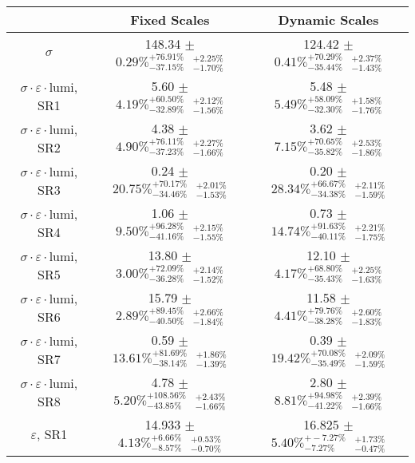 \documentclass{article}
\begin{document}
\renewcommand{\arraystretch}{1.5}
\begin{table}
\begin{tabular}{|c|c|c|}
\hline
 & Fixed Scales & Dynamic Scales\\
\hline
$\sigma$ & 148.34 $\pm$ $0.29\%^{+76.91\%}_{-37.15\%} \textrm{ }^{+2.25\%}_{-1.70\%}$ & 124.42 $\pm$ $0.41\%^{+70.29\%}_{-35.44\%} \textrm{ }^{+2.37\%}_{-1.43\%}$ \\
\hline
$\sigma \cdot \varepsilon \cdot \textrm{lumi}$, SR1 & 5.60 $\pm$ $4.19\%^{+60.50\%}_{-32.89\%} \textrm{ }^{+2.12\%}_{-1.56\%}$ & 5.48 $\pm$ $5.49\%^{+58.09\%}_{-32.30\%} \textrm{ }^{+1.58\%}_{-1.76\%}$ \\
\hline
$\sigma \cdot \varepsilon \cdot \textrm{lumi}$, SR2 & 4.38 $\pm$ $4.90\%^{+76.11\%}_{-37.23\%} \textrm{ }^{+2.27\%}_{-1.66\%}$ & 3.62 $\pm$ $7.15\%^{+70.65\%}_{-35.82\%} \textrm{ }^{+2.53\%}_{-1.86\%}$ \\
\hline
$\sigma \cdot \varepsilon \cdot \textrm{lumi}$, SR3 & 0.24 $\pm$ $20.75\%^{+70.17\%}_{-34.46\%} \textrm{ }^{+2.01\%}_{-1.53\%}$ & 0.20 $\pm$ $28.34\%^{+66.67\%}_{-34.38\%} \textrm{ }^{+2.11\%}_{-1.59\%}$ \\
\hline
$\sigma \cdot \varepsilon \cdot \textrm{lumi}$, SR4 & 1.06 $\pm$ $9.50\%^{+96.28\%}_{-41.16\%} \textrm{ }^{+2.15\%}_{-1.55\%}$ & 0.73 $\pm$ $14.74\%^{+91.63\%}_{-40.11\%} \textrm{ }^{+2.21\%}_{-1.75\%}$ \\
\hline
$\sigma \cdot \varepsilon \cdot \textrm{lumi}$, SR5 & 13.80 $\pm$ $3.00\%^{+72.09\%}_{-36.28\%} \textrm{ }^{+2.14\%}_{-1.52\%}$ & 12.10 $\pm$ $4.17\%^{+68.80\%}_{-35.43\%} \textrm{ }^{+2.25\%}_{-1.63\%}$ \\
\hline
$\sigma \cdot \varepsilon \cdot \textrm{lumi}$, SR6 & 15.79 $\pm$ $2.89\%^{+89.45\%}_{-40.50\%} \textrm{ }^{+2.66\%}_{-1.84\%}$ & 11.58 $\pm$ $4.41\%^{+79.76\%}_{-38.28\%} \textrm{ }^{+2.60\%}_{-1.83\%}$ \\
\hline
$\sigma \cdot \varepsilon \cdot \textrm{lumi}$, SR7 & 0.59 $\pm$ $13.61\%^{+81.69\%}_{-38.14\%} \textrm{ }^{+1.86\%}_{-1.39\%}$ & 0.39 $\pm$ $19.42\%^{+70.08\%}_{-35.49\%} \textrm{ }^{+2.09\%}_{-1.59\%}$ \\
\hline
$\sigma \cdot \varepsilon \cdot \textrm{lumi}$, SR8 & 4.78 $\pm$ $5.20\%^{+108.56\%}_{-43.85\%} \textrm{ }^{+2.43\%}_{-1.66\%}$ & 2.80 $\pm$ $8.81\%^{+94.98\%}_{-41.22\%} \textrm{ }^{+2.39\%}_{-1.66\%}$ \\
\hline
$\varepsilon$, SR1 & 14.933 $\pm$ $4.13\%^{+6.66\%}_{-8.57\%} \textrm{ }^{+0.53\%}_{-0.70\%}$ & 16.825 $\pm$ $5.40\%^{+-7.27\%}_{-7.27\%} \textrm{ }^{+1.73\%}_{-0.47\%}$ \\ 

\end{tabular}
\end{table}
\end{document}
